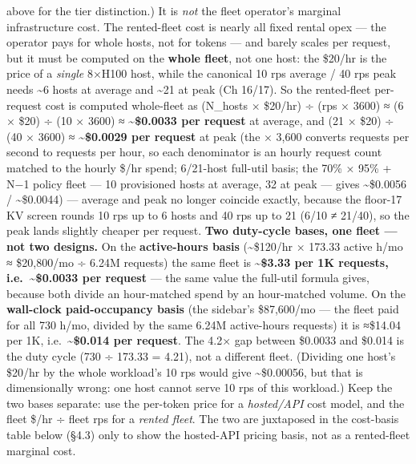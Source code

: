 \begin{itemize}
  above for the tier distinction.) It is \emph{not} the fleet operator's
  marginal infrastructure cost. The rented-fleet cost is nearly all
  fixed rental opex --- the operator pays for whole hosts, not for
  tokens --- and barely scales per request, but it must be computed on
  the \textbf{whole fleet}, not one host: the \$20/hr is the price of a
  \emph{single} 8×H100 host, while the canonical 10 rps average / 40 rps
  peak needs \textasciitilde6 hosts at average and \textasciitilde21 at
  peak (Ch 16/17). So the rented-fleet per-request cost is computed
  whole-fleet as (N\_hosts × \$20/hr) ÷ (rps × 3600) ≈ (6 × \$20) ÷ (10
  × 3600) ≈ \textbf{\textasciitilde\$0.0033 per request} at average, and
  (21 × \$20) ÷ (40 × 3600) ≈ \textbf{\textasciitilde\$0.0029 per
  request} at peak (the × 3,600 converts requests per second to requests
  per hour, so each denominator is an hourly request count matched to
  the hourly \$/hr spend; 6/21-host full-util basis; the 70\% × 95\% +
  N−1 policy fleet --- 10 provisioned hosts at average, 32 at peak ---
  gives \textasciitilde\$0.0056 / \textasciitilde\$0.0044) --- average
  and peak no longer coincide exactly, because the floor-17 KV screen
  rounds 10 rps up to 6 hosts and 40 rps up to 21 (6/10 ≠ 21/40), so the
  peak lands slightly cheaper per request. \textbf{Two duty-cycle bases,
  one fleet --- not two designs.} On the \textbf{active-hours basis}
  (\textasciitilde\$120/hr × 173.33 active h/mo ≈ \$20,800/mo ÷ 6.24M
  requests) the same fleet is \textbf{\textasciitilde\$3.33 per 1K
  requests, i.e.~\textasciitilde\$0.0033 per request} --- the same value
  the full-util formula gives, because both divide an hour-matched spend
  by an hour-matched volume. On the \textbf{wall-clock paid-occupancy
  basis} (the sidebar's \$87,600/mo --- the fleet paid for all 730 h/mo,
  divided by the same 6.24M active-hours requests) it is ≈\$14.04 per
  1K, i.e.~\textbf{\textasciitilde\$0.014 per request}. The 4.2× gap
  between \$0.0033 and \$0.014 is the duty cycle (730 ÷ 173.33 = 4.21),
  not a different fleet. (Dividing one host's \$20/hr by the whole
  workload's 10 rps would give \textasciitilde\$0.00056, but that is
  dimensionally wrong: one host cannot serve 10 rps of this workload.)
  Keep the two bases separate: use the per-token price for a
  \emph{hosted/API} cost model, and the fleet \$/hr ÷ fleet rps for a
  \emph{rented fleet}. The two are juxtaposed in the cost-basis table
  below (§4.3) only to show the hosted-API pricing basis, not as a
  rented-fleet marginal cost.
\end{itemize}

